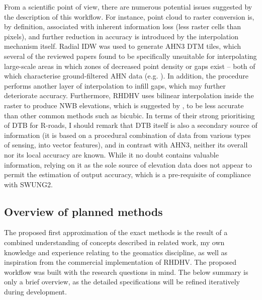 From a scientific point of view, there are numerous potential issues suggested by the description of this workflow. For instance, point cloud to raster conversion is, by definition, associated with inherent information loss (less raster cells than pixels), and further reduction in accuracy is introduced by the interpolation mechanism itself. Radial IDW was used to generate AHN3 DTM tiles, which several of the reviewed papers found to be specifically unsuitable for interpolating large-scale areas in which zones of decreased point density or gaps exist – both of which characterise ground-filtered AHN data (e.g. \cite{guo_etal_2010}). In addition, the procedure performs another layer of interpolation to infill gaps, which may further deteriorate accuracy. Furthermore, RHDHV uses bilinear interpolation inside the raster to produce NWB elevations, which is suggested by \cite{shi_etal_2005}, to be less accurate than other common methods such as bicubic. In terms of their strong prioritising of DTB for R-roads, I should remark that DTB itself is also a secondary source of information (it is based on a procedural combination of data from various types of sensing, into vector features), and in contrast with AHN3, neither its overall nor its local accuracy are known. While it no doubt contains valuable information, relying on it as the sole source of elevation data does not appear to permit the estimation of output accuracy, which is a pre-requisite of compliance with SWUNG2.

\subsection{Overview of planned methods}
\label{sub:methodsoverview}

The proposed first approximation of the exact methods is the result of a combined understanding of concepts described in related work, my own knowledge and experience relating to the geomatics discipline, as well as inspiration from the commercial implementation of RHDHV. The proposed workflow was built with the research questions in mind. The below summary is only a brief overview, as the detailed specifications will be refined iteratively during development.

